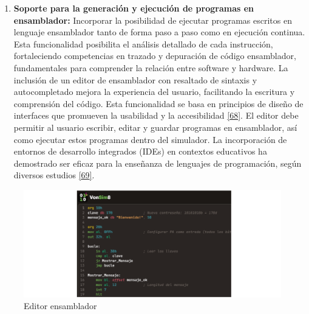 \documentclass[12pt,oneside]{templates/unerthesis}
\providecommand{\tightlist}{%
  \setlength{\itemsep}{0pt}\setlength{\parskip}{0pt}}
\begin{document}
\begin{enumerate}
\def\labelenumi{\arabic{enumi}.}
\setcounter{enumi}{1}
\tightlist
\item
  \textbf{Soporte para la generación y ejecución de programas en ensamblador:}
  Incorporar la posibilidad de ejecutar programas escritos en lenguaje ensamblador tanto de forma paso a paso como en ejecución continua. Esta funcionalidad posibilita el análisis detallado de cada instrucción, fortaleciendo competencias en trazado y depuración de código ensamblador, fundamentales para comprender la relación entre software y hardware.
  La inclusión de un editor de ensamblador con resaltado de sintaxis y autocompletado mejora la experiencia del usuario, facilitando la escritura y comprensión del código. Esta funcionalidad se basa en principios de diseño de interfaces que promueven la usabilidad y la accesibilidad \protect\hyperlink{ref-w3c_accessibility_2021}{{[}68{]}}. El editor debe permitir al usuario escribir, editar y guardar programas en ensamblador, así como ejecutar estos programas dentro del simulador. La incorporación de entornos de desarrollo integrados (IDEs) en contextos educativos ha demostrado ser eficaz para la enseñanza de lenguajes de programación, según diversos estudios \protect\hyperlink{ref-mccracken2001does}{{[}69{]}}.
\end{enumerate}

\begin{figure}

{\centering \includegraphics[width=0.9\linewidth]{images/editor} 

}

\caption{Editor ensamblador}\label{fig:editor}
\end{figure}
\end{document}
